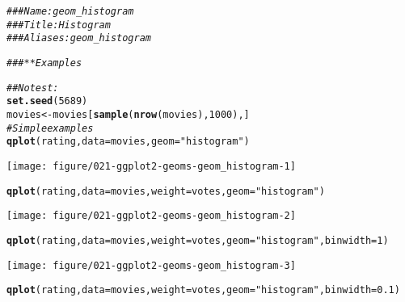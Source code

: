 \documentclass[a4paper,titlepage]{tufte-handout}\usepackage[]{graphicx}\usepackage[]{color}
\makeatletter
\def\maxwidth{ %
  \ifdim\Gin@nat@width>\linewidth
    \linewidth
  \else
    \Gin@nat@width
  \fi
}
\newcommand{\hlnum}[1]{\textcolor[rgb]{0.686,0.059,0.569}{#1}}%
\newcommand{\hlstr}[1]{\textcolor[rgb]{0.192,0.494,0.8}{#1}}%
\newcommand{\hlcom}[1]{\textcolor[rgb]{0.678,0.584,0.686}{\textit{#1}}}%
\newcommand{\hlstd}[1]{\textcolor[rgb]{0.345,0.345,0.345}{#1}}%
\newcommand{\hlkwb}[1]{\textcolor[rgb]{0.69,0.353,0.396}{#1}}%
\newcommand{\hlkwc}[1]{\textcolor[rgb]{0.333,0.667,0.333}{#1}}%
\newcommand{\hlkwd}[1]{\textcolor[rgb]{0.737,0.353,0.396}{\textbf{#1}}}%
\newenvironment{kframe}{%
 \def\at@end@of@kframe{}%
 \ifinner\ifhmode%
  \def\at@end@of@kframe{\end{minipage}}%
  \begin{minipage}{\columnwidth}%
 \fi\fi%
 \def\FrameCommand##1{\hskip\@totalleftmargin \hskip-\fboxsep
 \colorbox{shadecolor}{##1}\hskip-\fboxsep
     \hskip-\linewidth \hskip-\@totalleftmargin \hskip\columnwidth}%
 \MakeFramed {\advance\hsize-\width
   \@totalleftmargin\z@ \linewidth\hsize
   \@setminipage}}%
 {\par\unskip\endMakeFramed%
 \at@end@of@kframe}
\newenvironment{knitrout}{}{} %
\makeatother
\begin{document}
\begin{knitrout}
\color{fgcolor}\begin{kframe}
\begin{alltt}
\hlcom{### Name: geom_histogram}
\hlcom{### Title: Histogram}
\hlcom{### Aliases: geom_histogram}

\hlcom{### ** Examples}

\hlcom{## No test: }
\hlkwd{set.seed}\hlstd{(}\hlnum{5689}\hlstd{)}
\hlstd{movies} \hlkwb{<-} \hlstd{movies[}\hlkwd{sample}\hlstd{(}\hlkwd{nrow}\hlstd{(movies),} \hlnum{1000}\hlstd{), ]}
\hlcom{# Simple examples}
\hlkwd{qplot}\hlstd{(rating,} \hlkwc{data}\hlstd{=movies,} \hlkwc{geom}\hlstd{=}\hlstr{"histogram"}\hlstd{)}
\end{alltt}


{\ttfamily\noindent\color{warningcolor}{\#\# Warning in loop\_apply(n, do.ply): position\_stack requires constant width: output may be incorrect}}\end{kframe}
\texttt{[image: figure/021-ggplot2-geoms-geom\_histogram-1]} 
\begin{kframe}\begin{alltt}
\hlkwd{qplot}\hlstd{(rating,} \hlkwc{data}\hlstd{=movies,} \hlkwc{weight}\hlstd{=votes,} \hlkwc{geom}\hlstd{=}\hlstr{"histogram"}\hlstd{)}
\end{alltt}


{\ttfamily\noindent\color{warningcolor}{\#\# Warning in loop\_apply(n, do.ply): position\_stack requires constant width: output may be incorrect}}\end{kframe}
\texttt{[image: figure/021-ggplot2-geoms-geom\_histogram-2]} 
\begin{kframe}\begin{alltt}
\hlkwd{qplot}\hlstd{(rating,} \hlkwc{data}\hlstd{=movies,} \hlkwc{weight}\hlstd{=votes,} \hlkwc{geom}\hlstd{=}\hlstr{"histogram"}\hlstd{,} \hlkwc{binwidth}\hlstd{=}\hlnum{1}\hlstd{)}
\end{alltt}
\end{kframe}
\texttt{[image: figure/021-ggplot2-geoms-geom\_histogram-3]} 
\begin{kframe}\begin{alltt}
\hlkwd{qplot}\hlstd{(rating,} \hlkwc{data}\hlstd{=movies,} \hlkwc{weight}\hlstd{=votes,} \hlkwc{geom}\hlstd{=}\hlstr{"histogram"}\hlstd{,} \hlkwc{binwidth}\hlstd{=}\hlnum{0.1}\hlstd{)}
\end{alltt}



\end{kframe}
\end{knitrout}
\end{document}
